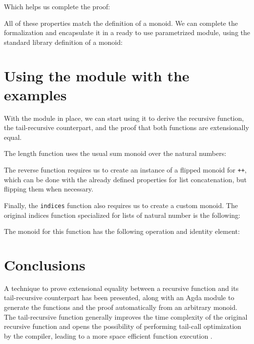 \documentclass[runningheads]{llncs}
\begin{document}
Which helps us complete the proof:



All of these properties match the definition of a monoid. We can complete the
formalization and encapsulate it in a ready to use parametrized module, using the
standard library definition of a monoid:



\section{Using the module with the examples}

With the module in place, we can start using it to derive the recursive function, the
tail-recursive counterpart, and the proof that both functions are extensionally equal.

The length function uses the usual sum monoid over the natural numbers:



The reverse function requires us to create an instance of a flipped monoid for
\lstinline{++}, which can be done with the already defined properties for list
concatenation, but flipping them when necessary.



Finally, the \lstinline{indices} function also requires us to create a custom monoid. The
original indices function specialized for lists of natural number is the following:



The monoid for this function has the following operation and identity element:



\section{Conclusions}

A technique to prove extensional equality between a recursive function and its
tail-recursive counterpart has been presented, along with an Agda module to generate the
functions and the proof automatically from an arbitrary monoid. The tail-recursive
function generally improves the time complexity of the original recursive function and
opens the possibility of performing tail-call optimization by the compiler, leading to a
more space efficient function execution
\cite{bauer2003compilation,rubio2017introduction}.
\end{document}
